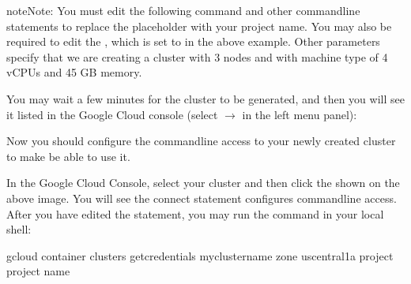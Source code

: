 \documentclass[letterpaper,10pt,english]{sphinxmanual}
\begin{document}
\begin{sphinxadmonition}{note}{Note:}
You must edit the following command and other command\sphinxhyphen{}line statements to replace the  placeholder with your project name. You may also be required to edit the , which is set to  in the above example. Other parameters specify that we are creating a cluster with 3 nodes and with machine type of 4 vCPUs and 45 GB memory.
\end{sphinxadmonition}

You may wait a few minutes for the cluster to be generated, and then you will see it listed in the Google Cloud console (select  \(\rightarrow\)  in the left menu panel):


Now you should configure the command\sphinxhyphen{}line access to your newly created cluster to make  be able to use it.

In the Google Cloud Console, select your cluster and then click the  shown on the above image. You will see the connect statement configures command\sphinxhyphen{}line access. After you have edited the statement, you may run the command in your local shell:

\begin{sphinxVerbatim}[commandchars=\\\{\}]
\PYGZdl{} gcloud container clusters get\PYGZhy{}credentials my\PYGZhy{}cluster\PYGZhy{}name \PYGZhy{}\PYGZhy{}zone us\PYGZhy{}central1\PYGZhy{}a \PYGZhy{}\PYGZhy{}project \PYGZlt{}project name\PYGZgt{}
\end{sphinxVerbatim}
\end{document}
